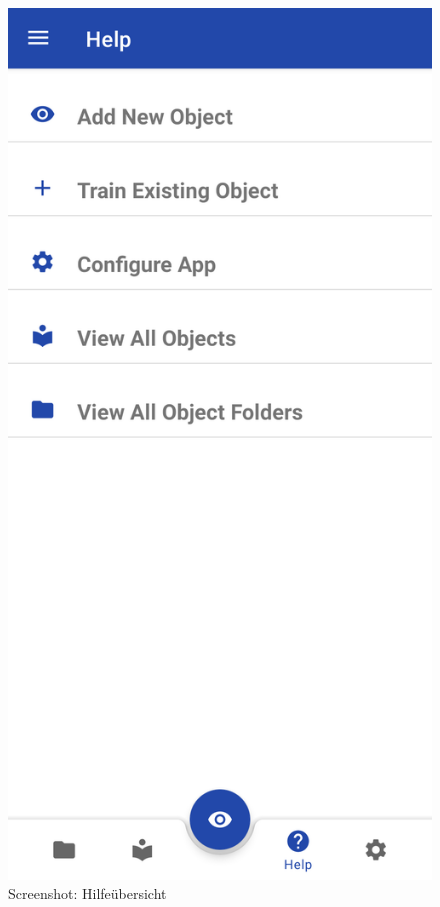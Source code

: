 \documentclass[oneside]{ausarbeitung}
\begin{document}
\begin{figure}[hptb]
	\centering
	\includegraphics[height=0.6\textheight]{images/screenshots/help-overview.png}
	\caption{Screenshot: Hilfeübersicht}
	\label{fig:screenshot:help-overview}
\end{figure}
\end{document}
